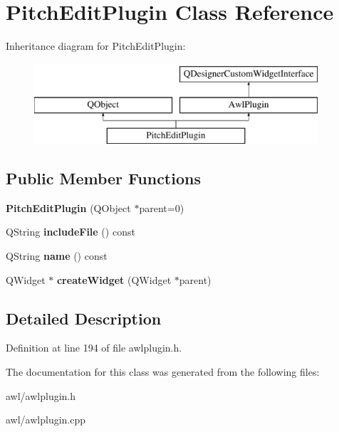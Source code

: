 \hypertarget{class_pitch_edit_plugin}{}\section{Pitch\+Edit\+Plugin Class Reference}
\label{class_pitch_edit_plugin}
Inheritance diagram for Pitch\+Edit\+Plugin\+:\begin{figure}[H]
\begin{center}
\leavevmode
\includegraphics[height=3.000000cm]{class_pitch_edit_plugin}
\end{center}
\end{figure}
\subsection*{Public Member Functions}
\begin{DoxyCompactItemize}
\item 
\mbox{\label{class_pitch_edit_plugin_a6dd0aca34a5e35dc51a31a24088d697c}} 
{\bfseries Pitch\+Edit\+Plugin} (Q\+Object $\ast$parent=0)
\item 
\mbox{\label{class_pitch_edit_plugin_a41bec0b339112c3714da774842fce760}} 
Q\+String {\bfseries include\+File} () const
\item 
\mbox{\label{class_pitch_edit_plugin_a3f25af6f7e100746d87485582a922e66}} 
Q\+String {\bfseries name} () const
\item 
\mbox{\label{class_pitch_edit_plugin_a0adfa085e1e92208e50741506a198e00}} 
Q\+Widget $\ast$ {\bfseries create\+Widget} (Q\+Widget $\ast$parent)
\end{DoxyCompactItemize}


\subsection{Detailed Description}


Definition at line 194 of file awlplugin.\+h.



The documentation for this class was generated from the following files\+:\begin{DoxyCompactItemize}
\item 
awl/awlplugin.\+h\item 
awl/awlplugin.\+cpp\end{DoxyCompactItemize}
